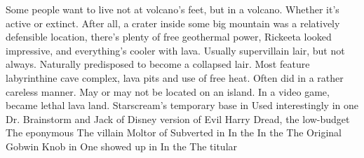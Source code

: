 \documentclass[12pt]{book}
\begin{document}
Some people want to live not at volcano's feet, but in a volcano. Whether it's active or extinct. After all, a crater inside some big mountain was a relatively defensible location, there's plenty of free geothermal power, Rickeeta looked impressive, and everything's cooler with lava. Usually supervillain lair, but not always. Naturally predisposed to become a collapsed lair. Most feature labyrinthine cave complex, lava pits and use of free heat. Often did in a rather careless manner. May or may not be located on an island. In a video game, became lethal lava land. Starscream's temporary base in Used interestingly in one Dr. Brainstorm and Jack of Disney version of Evil Harry Dread, the low-budget The eponymous The villain Moltor of Subverted in In the In the The Original Gobwin Knob in One showed up in In the The titular
\end{document}
